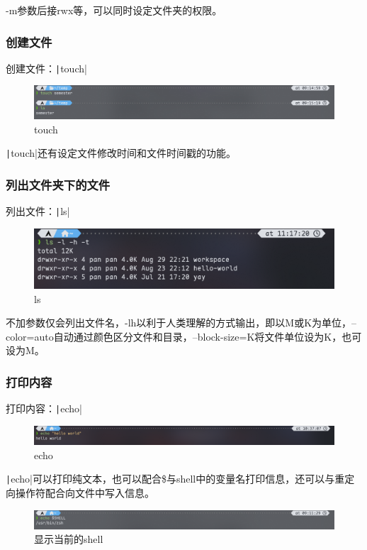 \documentclass[fontset=ubuntu]{ctexart}
\begin{document}
\begin{sloppypar}
-m参数后接rwx等，可以同时设定文件夹的权限。

\subsubsection{创建文件}
创建文件：\texttt|touch|
\begin{figure}
    \centering
    \includegraphics[width=0.75\linewidth]{Touch.png}
    \caption{touch}
    \label{fig:touch}
\end{figure}

\texttt|touch|还有设定文件修改时间和文件时间戳的功能。

\subsubsection{列出文件夹下的文件}
列出文件：\texttt|ls|
\begin{figure}[htb]
    \centering
    \includegraphics[width=0.75\linewidth]{Ls.png}
    \caption{ls}
    \label{fig:ls}
\end{figure}

不加参数仅会列出文件名，-lh以利于人类理解的方式输出，即以M或K为单位，--color=auto自动通过颜色区分文件和目录，--block-size=K将文件单位设为K，也可设为M。

\subsubsection{打印内容}
打印内容：\texttt|echo|
\begin{figure}[htb]
    \centering
    \includegraphics[width=0.75\linewidth]{Echo.png}
    \caption{echo}
    \label{fig:echo}
\end{figure}

\texttt|echo|可以打印纯文本，也可以配合\$与shell中的变量名打印信息，还可以与重定向操作符配合向文件中写入信息。
\begin{figure}[htb]
    \centering
    \includegraphics[width=0.75\linewidth]{Shell.png}
    \caption{显示当前的shell}
    \label{fig:Shell}
\end{figure}


\end{sloppypar}
\end{document}
